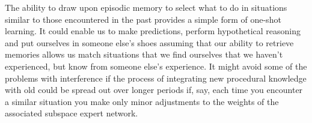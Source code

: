 The ability to draw upon episodic memory to select what to do in situations similar to those encountered in the past provides a simple form of one-shot learning. It could enable us to make predictions, perform hypothetical reasoning and put ourselves in someone else's shoes assuming that our ability to retrieve memories allows us match situations that we find ourselves that we haven't experienced, but know from someone else's experience. It might avoid some of the problems with interference if the process of integrating new procedural knowledge with old could be spread out over longer periods if, say, each time you encounter a similar situation you make only minor adjustments to the weights of the associated subspace expert network. 





